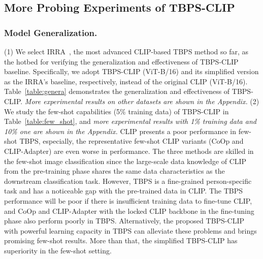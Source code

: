 \documentclass[letterpaper]{article} %
\begin{document}

\subsection{More Probing Experiments of TBPS-CLIP}

\subsubsection{Model Generalization.}
(1) We select IRRA~\cite{jiang2023cross}, the most advanced CLIP-based TBPS method so far, as the hotbed for verifying the generalization and effectiveness of TBPS-CLIP baseline.
Specifically, we adopt TBPS-CLIP (ViT-B/16) and its simplified version as the IRRA's baseline, respectively, instead of the original CLIP (ViT-B/16).
Table~\ref{table:genera} demonstrates the generalization and effectiveness of TBPS-CLIP.
\emph{More experimental results on other datasets are shown in the Appendix.}
(2) We study the few-shot capabilities (5\% training data) of TBPS-CLIP in Table~\ref{table:few_shot}, and \emph{more experimental results with 1\% training data and 10\% one are shown in the Appendix.}
CLIP presents a poor performance in few-shot TBPS, especially, the representative few-shot CLIP variants (CoOp and CLIP-Adapter) are even worse in performance.
The three methods are skilled in the few-shot image classification since the large-scale data knowledge of CLIP from the pre-training phase shares the same data characteristics as the downstream classification task.
However, TBPS is a fine-grained person-specific task and has a noticeable gap with the pre-trained data in CLIP.
The TBPS performance will be poor if there is insufficient training data to fine-tune CLIP,
and CoOp and CLIP-Adapter with the locked CLIP backbone in the fine-tuning phase also perform poorly in TBPS.
Alternatively, the proposed TBPS-CLIP with powerful learning capacity in TBPS can alleviate these problems and brings promising few-shot results.
More than that, the simplified TBPS-CLIP has superiority in the few-shot setting.

\end{document}
